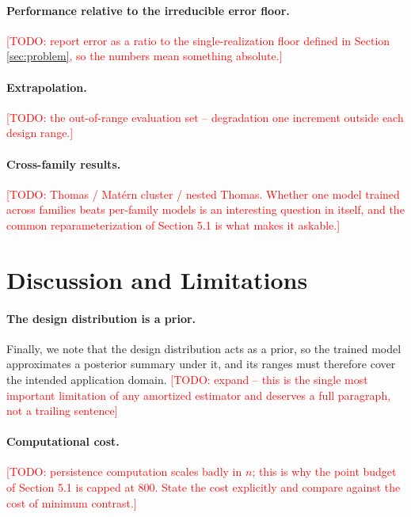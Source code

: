 \documentclass[11pt,letterpaper]{article}
\newcommand{\1}{\mathds{1}}
\newcommand{\todo}[1]{\textcolor{red}{[TODO: #1]}}
\newcommand{\todo}[1]{}
\theoremstyle{plain}
\theoremstyle{definitioncolon}
\begin{document}
\paragraph{Performance relative to the irreducible error floor.}
\todo{report error as a ratio to the single-realization floor defined in
Section \ref{sec:problem}, so the numbers mean something absolute.}

\paragraph{Extrapolation.}
\todo{the out-of-range evaluation set -- degradation one increment outside each
design range.}

\paragraph{Cross-family results.}
\todo{Thomas / Mat\'ern cluster / nested Thomas. Whether one model trained across
families beats per-family models is an interesting question in itself, and the
common reparameterization of Section 5.1 is what makes it askable.}


\section{Discussion and Limitations}

\paragraph{The design distribution is a prior.}
Finally, we note that the design distribution acts as a prior, so the trained
model approximates a posterior summary under it, and its ranges must therefore
cover the intended application domain.
\todo{expand -- this is the single most important limitation of any amortized
estimator and deserves a full paragraph, not a trailing sentence}

\paragraph{Computational cost.}
\todo{persistence computation scales badly in $n$; this is why the point budget
of Section 5.1 is capped at 800. State the cost explicitly and compare against
the cost of minimum contrast.}
\end{document}
